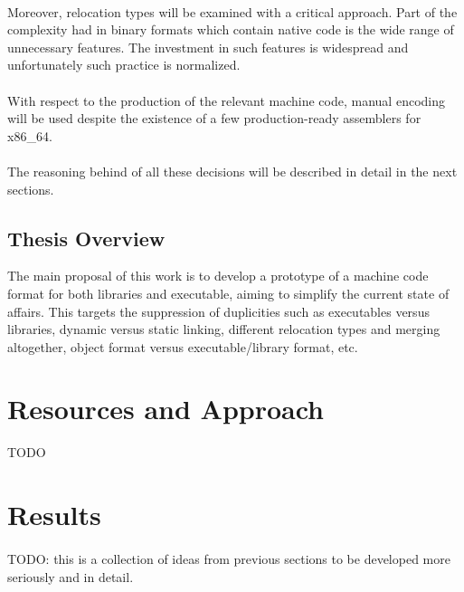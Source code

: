 \documentclass[12pt]{article}
\begin{document}
    \paragraph{}Moreover, relocation types will be examined with a critical approach. Part of the complexity had in binary formats which contain native code is the wide range of unnecessary features. The investment in such features is widespread and unfortunately such practice is normalized.
    
    \paragraph{} With respect to the production of the relevant machine code, manual encoding will be used despite the existence of a few production-ready assemblers for x86\_64. 
    
    \paragraph{} The reasoning behind of all these decisions will be described in detail in the next sections.


	\subsection{Thesis Overview}
	The main proposal of this work is to develop a prototype of a machine code format for both libraries and executable, aiming to simplify the current state of affairs. This targets the suppression of duplicities such as executables versus libraries, dynamic versus static linking, different relocation types and merging altogether, object format versus executable/library format, etc.
	\section{Resources and Approach}
	TODO
	\section{Results}
		\paragraph{}TODO: this is a collection of ideas from previous sections to be developed more seriously and in detail.
\end{document}
